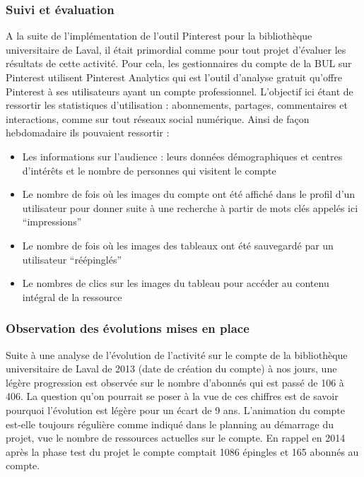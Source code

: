 \documentclass[a4paper,11pt]{article} %
\begin{document}
\subsubsection{ Suivi et évaluation}

A la suite de l’implémentation de l’outil Pinterest pour la bibliothèque universitaire de 
Laval, il était primordial comme pour tout projet d’évaluer les résultats de cette activité. Pour 
cela, les gestionnaires du compte de la BUL sur Pinterest utilisent Pinterest Analytics qui est 
l’outil d’analyse gratuit qu’offre Pinterest à ses utilisateurs ayant un compte professionnel. L’objectif ici étant de ressortir les statistiques d’utilisation : abonnements, partages, commentaires et interactions, comme sur tout réseaux social numérique. Ainsi de façon hebdomadaire ils pouvaient ressortir :
\begin{itemize}
\item Les informations sur l’audience : leurs données démographiques et centres d’intérêts et 
le nombre de personnes qui visitent le compte
\item Le nombre de fois où les images du compte ont été affiché dans le profil d’un utilisateur 
pour donner suite à une recherche à partir de mots clés appelés ici “impressions”
\item Le nombre de fois où les images des tableaux ont été sauvegardé par un utilisateur 
“réépinglés”
\item Le nombres de clics sur les images du tableau pour accéder au contenu intégral de la 
ressource
\end{itemize}

\subsubsection{ Observation des évolutions mises en place}

Suite à une analyse de l’évolution de l’activité sur le compte de la bibliothèque universitaire de Laval de 2013 (date de création du compte) à nos jours, une légère progression est observée sur le nombre d’abonnés qui est passé de 106 à 406. La question qu’on pourrait se poser à la vue de ces chiffres est de savoir pourquoi l’évolution est légère pour un écart de 9 
ans. L’animation du compte est-elle toujours régulière comme indiqué dans le planning au démarrage du projet, vue le nombre de ressources actuelles sur le compte. En rappel en 2014 après la phase test du projet le compte comptait 1086 épingles et 165 abonnés au compte.
\end{document}
